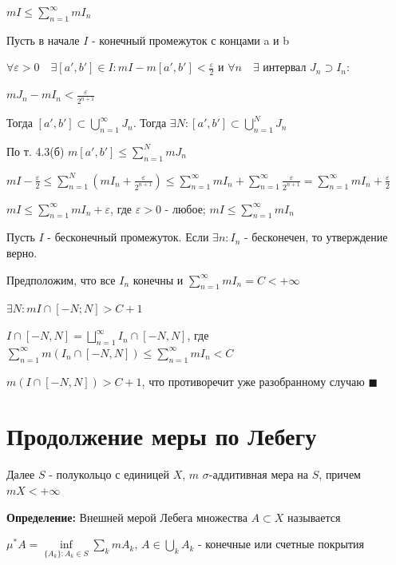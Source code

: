 \documentclass[a4paper]{report}
\begin{document}
$mI\le\sum\limits_{n=1}^\infty mI_n$

Пусть в начале $I$ - конечный промежуток с концами a и b

$\forall\varepsilon>0\quad\exists[a',b']\in I\colon mI-m[a',b']<\frac\varepsilon2$ и $\forall n\quad\exists$ интервал 
$J_n\supset I_n\colon$ 

$mJ_n-mI_n<\displaystyle\frac{\varepsilon}{2^{n+1}}$

Тогда $[a',b']\subset\bigcup\limits_{n=1}^\infty J_n$. Тогда $\exists N\colon[a',b']\subset\bigcup\limits_{n=1}^N J_n$

По т. 4.3(б) $m[a',b']\le\sum\limits_{n=1}^N mJ_n$

$mI-\frac\varepsilon2\le\sum\limits_{n=1}^N\left(mI_n+\displaystyle\frac{\varepsilon}{2^{n+1}}\right)\le\sum\limits_{n=1}^\infty mI_n
+\sum\limits_{n=1}^\infty\displaystyle\frac{\varepsilon}{2^{n+1}}=\sum\limits_{n=1}^\infty mI_n+\frac\varepsilon2$

$mI\le\sum\limits_{n=1}^\infty mI_n+\varepsilon$, где $\varepsilon>0$ - любое; $mI\le\sum\limits_{n=1}^\infty mI_n$

Пусть $I$ - бесконечный промежуток. Если $\exists n\colon I_n$ - бесконечен, то утверждение верно. 

Предположим, что все $I_n$ конечны и $\sum\limits_{n=1}^\infty mI_n=C<+\infty$

$\exists N\colon mI\cap[-N;N]>C+1$

$I\cap[-N,N]=\bigsqcup\limits_{n=1}^\infty I_n\cap[-N,N]$, где $\sum\limits_{n=1}^\infty m\left(I_n\cap[-N,N]\right)\le
\sum\limits_{n=1}^\infty mI_n<C$

 $m\left(I\cap[-N,N]\right)>C+1$, что противоречит уже разобранному случаю $\blacksquare$

 
 
 
 
 
 
 
 
\chapter{Продолжение меры по Лебегу}

Далее $S$ - полукольцо с единицей $X$, $m$ $\sigma$-аддитивная мера на $S$, причем $mX<+\infty$
\bigskip

\noindent\textbf{Определение:} Внешней мерой Лебега множества $A\subset X$ называется 

$\mu^*A=\inf\limits_{\{A_k\}\colon A_k\in S}\sum\limits_k mA_k$, $A\in\bigcup\limits_k A_k$ - конечные или счетные покрытия
\end{document}
